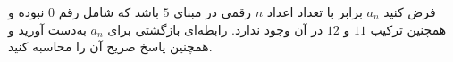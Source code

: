     \p 
فرض کنید
$a_n$
برابر با تعداد اعداد
$n$
رقمی در مبنای
$5$
باشد که شامل رقم
$0$
نبوده و همچنین ترکیب
$11$
و
$12$
در آن وجود ندارد. رابطه‌ای بازگشتی برای
$a_n$
به‌دست آورید و همچنین پاسخ صریح آن را محاسبه کنید.